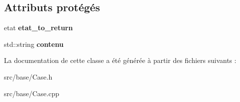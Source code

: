 \subsection*{Attributs protégés}
\begin{DoxyCompactItemize}
\item 
\mbox{\label{class_case_af0979bafd87649acb864af1400e80495}} 
etat {\bfseries etat\+\_\+to\+\_\+return}
\item 
\mbox{\label{class_case_a8a875eb6aa07f2440a534b7ac8f23ad7}} 
std\+::string {\bfseries contenu}
\end{DoxyCompactItemize}


La documentation de cette classe a été générée à partir des fichiers suivants \+:\begin{DoxyCompactItemize}
\item 
src/base/Case.\+h\item 
src/base/Case.\+cpp\end{DoxyCompactItemize}
